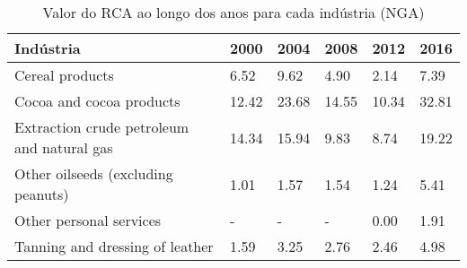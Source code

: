 \begin{table}
\centering
\caption{Valor do RCA ao longo dos anos para cada indústria (NGA)}
\label{tab:ex3-tempo-NGA}
\begin{tabular}{p{6cm}p{1.5cm}p{1.5cm}p{1.5cm}p{1.5cm}p{1.5cm}}
\toprule
                                 Indústria &  2000 &  2004 &  2008 &  2012 &  2016 \\
\midrule
                           Cereal products &  6.52 &  9.62 &  4.90 &  2.14 &  7.39 \\
                  Cocoa and cocoa products & 12.42 & 23.68 & 14.55 & 10.34 & 32.81 \\
Extraction crude petroleum and natural gas & 14.34 & 15.94 &  9.83 &  8.74 & 19.22 \\
        Other oilseeds (excluding peanuts) &  1.01 &  1.57 &  1.54 &  1.24 &  5.41 \\
                   Other personal services &     - &     - &     - &  0.00 &  1.91 \\
           Tanning and dressing of leather &  1.59 &  3.25 &  2.76 &  2.46 &  4.98 \\
\bottomrule
\end{tabular}
\end{table}
